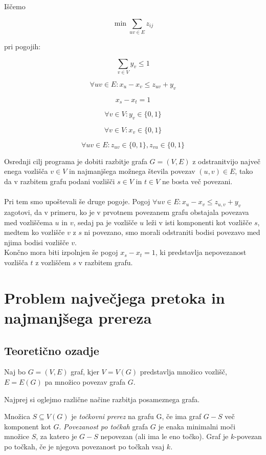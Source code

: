 \documentclass[a4paper,12pt]{article}
\theoremstyle{definition}
\begin{document}
Iščemo

$$ \min \sum_{uv \in E} z_{ij} $$

pri pogojih:

$$
\sum_{v \in V} y_{v} \le 1 
$$

$$
\forall uv \in E: x_u - x_v \le z_{uv} + y_v
$$

$$
x_s - x_t = 1 
$$

$$
\forall v \in V : y_v \in \{0,1\} 
$$

$$
\forall v \in V: x_v \in \{0,1\}
$$
 
$$
\forall uv \in E : z_{uv} \in \{0,1\}, z_{vu} \in \{0,1\} 
$$

Osrednji cilj programa je dobiti razbitje grafa $G= (V,E)$ z odstranitvijo 
največ enega vozlišča $v \in V$ in najmanjšega možnega števila povezav $(u,v) \in E$, 
tako da v razbitem grafu podani vozlišči $s \in V$ in $t \in V$ ne bosta več povezani.\\
\\
Pri tem smo upoštevali še druge pogoje. Pogoj $\forall uv \in E: x_u - x_v \le z_{u,v} + y_v $  zagotovi, 
da v primeru, ko je v prvotnem povezanem grafu obstajala povezava med vozliščema $u$ in $v$,
sedaj pa je vozlišče $u$ leži v isti komponenti kot vozlišče $s$, medtem ko vozlišče $v$ z $s$ ni povezano, 
smo morali odstraniti bodisi povezavo med njima bodisi vozlišče $v$.\\

Končno mora biti izpolnjen še pogoj $ x_s - x_t = 1$, 
ki predstavlja nepovezanost vozlišča $t$ z vozliščem $s$ v razbitem grafu. \\


\section{Problem največjega pretoka in najmanjšega prereza}

\subsection{Teoretično ozadje}


Naj bo $G = (V, E)$ graf, kjer $V = V(G)$ predstavlja množico vozlišč,
$E = E(G)$ pa množico povezav grafa $G$.\newline

Najprej si oglejmo različne načine razbitja posameznega grafa.


Množica $S \subseteq V(G)$ je \textit{točkovni prerez} na grafu G,
če ima graf $G - S$ več komponent kot $G$. \textit{Povezanost po točkah}
grafa $G$ je enaka minimalni moči množice $S$, za katero je $G - S$ 
nepovezan (ali ima le eno točko). Graf je $k$-povezan po točkah, 
če je njegova povezanost po točkah vsaj $k$.
\end{document}
